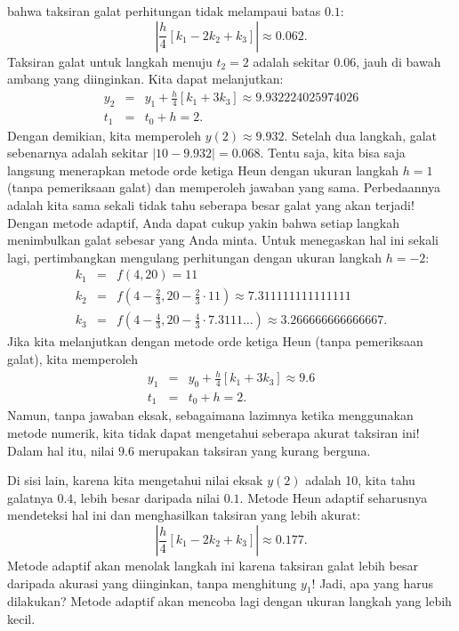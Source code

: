 bahwa taksiran galat perhitungan tidak melampaui batas $0.1$:
\[
\left|\frac{h}{4}\left[k_{1}-2k_{2}+k_{3}\right]\right|\approx0.062.
\]
Taksiran galat untuk langkah menuju $t_{2}=2$ adalah sekitar $0.06$,
jauh di bawah ambang yang diinginkan. Kita dapat melanjutkan:
\begin{eqnarray*}
y_{2} & = & y_{1}+\frac{h}{4}\left[k_{1}+3k_{3}\right]\approx9.932224025974026\\
t_{1} & = & t_{0}+h=2.
\end{eqnarray*}
Dengan demikian, kita memperoleh $y(2)\approx9.932$. Setelah dua
langkah, galat sebenarnya adalah sekitar $|10-9.932|=0.068$. Tentu
saja, kita bisa saja langsung menerapkan metode orde ketiga Heun dengan
ukuran langkah $h=1$ (tanpa pemeriksaan galat) dan memperoleh jawaban
yang sama. Perbedaannya adalah kita sama sekali tidak tahu seberapa
besar galat yang akan terjadi! Dengan metode adaptif, Anda dapat cukup
yakin bahwa setiap langkah menimbulkan galat sebesar yang Anda minta.
Untuk menegaskan hal ini sekali lagi, pertimbangkan mengulang perhitungan
dengan ukuran langkah $h=-2$:
\begin{eqnarray*}
k_{1} & = & f(4,20)=11\\
k_{2} & = & f\left(4-\frac{2}{3},20-\frac{2}{3}\cdot11\right)\approx7.311111111111111\\
k_{3} & = & f\left(4-\frac{4}{3},20-\frac{4}{3}\cdot7.3111\ldots\right)\approx3.266666666666667.
\end{eqnarray*}
Jika kita melanjutkan dengan metode orde ketiga Heun (tanpa pemeriksaan
galat), kita memperoleh
\begin{eqnarray*}
y_{1} & = & y_{0}+\frac{h}{4}\left[k_{1}+3k_{3}\right]\approx9.6\\
t_{1} & = & t_{0}+h=2.
\end{eqnarray*}
Namun, tanpa jawaban eksak, sebagaimana lazimnya ketika menggunakan
metode numerik, kita tidak dapat mengetahui seberapa akurat taksiran
ini! Dalam hal itu, nilai $9.6$ merupakan taksiran yang kurang berguna.

Di sisi lain, karena kita mengetahui nilai eksak $y(2)$ adalah 10,
kita tahu galatnya $0.4$, lebih besar daripada nilai $0.1$. Metode
Heun adaptif seharusnya mendeteksi hal ini dan menghasilkan taksiran
yang lebih akurat:
\[
\left|\frac{h}{4}\left[k_{1}-2k_{2}+k_{3}\right]\right|\approx0.177.
\]
Metode adaptif akan menolak langkah ini karena taksiran galat lebih
besar daripada akurasi yang diinginkan, tanpa menghitung $y_{1}$!
Jadi, apa yang harus dilakukan? Metode adaptif akan mencoba lagi dengan
ukuran langkah yang lebih kecil.

